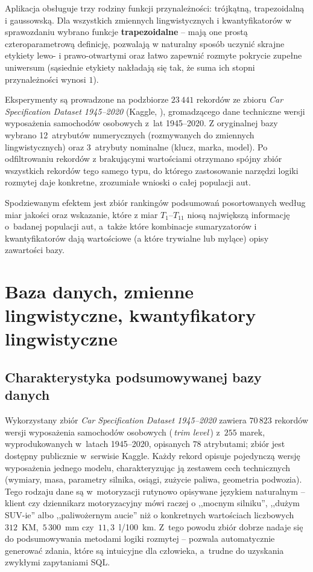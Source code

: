 \documentclass{article}
\begin{document}
Aplikacja obsługuje trzy rodziny funkcji przynależności: trójkątną,
trapezoidalną i gaussowską. Dla wszystkich zmiennych lingwistycznych
i kwantyfikatorów w sprawozdaniu wybrano funkcje
\textbf{trapezoidalne} -- mają one prostą czteroparametrową definicję,
pozwalają w naturalny sposób uczynić skrajne etykiety lewo- i
prawo-otwartymi oraz łatwo zapewnić rozmyte pokrycie zupełne
uniwersum (sąsiednie etykiety nakładają się tak, że suma ich stopni
przynależności wynosi $1$).

Eksperymenty są prowadzone na podzbiorze $23\,441$ rekordów ze zbioru
\textit{Car Specification Dataset 1945--2020} (Kaggle, \cite{kaggle-cars}),
gromadzącego dane techniczne wersji wyposażenia samochodów osobowych
z~lat 1945--2020. Z oryginalnej bazy wybrano 12~atrybutów numerycznych
(rozmywanych do zmiennych lingwistycznych) oraz 3~atrybuty nominalne
(klucz, marka, model). Po odfiltrowaniu rekordów z brakującymi wartościami
otrzymano spójny zbiór wszystkich rekordów tego samego typu, do którego
zastosowanie narzędzi logiki rozmytej daje konkretne, zrozumiałe wnioski
o całej populacji aut.

Spodziewanym efektem jest zbiór rankingów podsumowań posortowanych według
miar jakości oraz wskazanie, które z miar $T_1$--$T_{11}$ niosą największą
informację o~badanej populacji aut, a~także które kombinacje
sumaryzatorów i kwantyfikatorów dają wartościowe (a które trywialne lub
mylące) opisy zawartości bazy.


\section{Baza danych, zmienne lingwistyczne, kwantyfikatory lingwistyczne}

\subsection{Charakterystyka podsumowywanej bazy danych}
\label{sec:db}

Wykorzystany zbiór \textit{Car Specification Dataset 1945--2020}
\cite{kaggle-cars} zawiera $70\,823$ rekordów wersji wyposażenia
samochodów osobowych ($\,$\textit{trim level}$\,$) z~$255$ marek,
wyprodukowanych w~latach 1945--2020, opisanych $78$ atrybutami;
zbiór jest dostępny publicznie w~serwisie Kaggle. Każdy
rekord opisuje pojedynczą wersję wyposażenia jednego modelu, charakteryzując
ją zestawem cech technicznych
(wymiary, masa, parametry silnika, osiągi, zużycie paliwa, geometria
podwozia). Tego rodzaju dane są w~motoryzacji rutynowo opisywane językiem
naturalnym -- klient czy dziennikarz motoryzacyjny mówi raczej o
,,mocnym silniku'', ,,dużym SUV-ie'' albo ,,paliwożernym aucie'' niż o
konkretnych wartościach liczbowych $312$~KM,~$5\,300$~mm czy~$11{,}3$~l/100~km.
Z~tego powodu zbiór dobrze nadaje się do podsumowywania metodami
logiki rozmytej -- pozwala automatycznie generować zdania, które są
intuicyjne dla człowieka, a~trudne do uzyskania zwykłymi
zapytaniami SQL.
\end{document}
